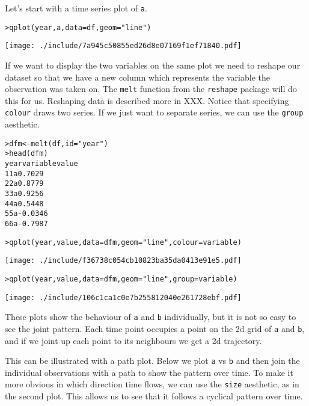 Let's start with a time series plot of {\tt a}.

\begin{alltt}
> qplot(year, a, data = df, geom = "line")
\end{alltt}
\texttt{[image: ./include/7a945c50855ed26d8e07169f1ef71840.pdf]}
\begin{alltt}

\end{alltt}

If we want to display the two variables on the same plot we need to reshape our dataset so that we have a new column which represents the variable the observation was taken on.  The {\tt melt} function from the {\tt reshape} package will do this for us.  Reshaping data is described more in XXX.  Notice that specifying {\tt colour} draws two series.  If we just want to separate series, we can use the {\tt group} aesthetic.

\begin{alltt}
> dfm <- melt(df, id = "year")
> head(dfm)
  year variable   value
1    1        a  0.7029
2    2        a  0.8779
3    3        a  0.9256
4    4        a  0.5448
5    5        a -0.0346
6    6        a -0.7987

> qplot(year, value, data = dfm, geom = "line", colour = variable)
\end{alltt}
\texttt{[image: ./include/f36738c054cb10823ba35da0413e91e5.pdf]}
\begin{alltt}

> qplot(year, value, data = dfm, geom = "line", group = variable)
\end{alltt}
\texttt{[image: ./include/106c1ca1c0e7b255812040e261728ebf.pdf]}
\begin{alltt}

\end{alltt}

These plots show the behaviour of {\tt a} and {\tt b} individually, but it is not so easy to see the joint pattern.  Each time point occupies a point on the 2d grid of {\tt a} and {\tt b}, and if we joint up each point to its neighbours we get a 2d trajectory.

This can be illustrated with a path plot.  Below we plot {\tt a} vs {\tt b} and then join the individual observations with a path to show the pattern over time.  To make it more obvious in which direction time flows, we can use the {\tt size} aesthetic, as in the second plot.   This allows us to see that it follows a cyclical pattern over time.

